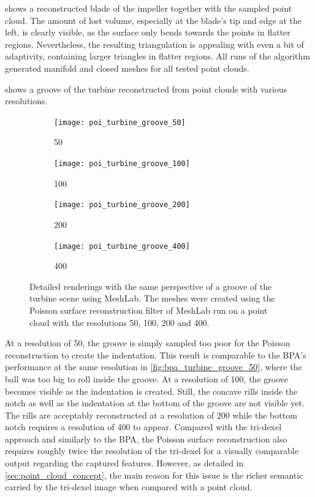  shows a reconstructed blade of the impeller together with the sampled point cloud.
The amount of lost volume, especially at the blade's tip and edge at the left, is clearly visible, as the surface only bends towards the points in flatter regions.
Nevertheless, the resulting triangulation is appealing with even a bit of adaptivity, containing larger triangles in flatter regions.
All runs of the algorithm generated manifold and closed meshes for all tested point clouds.

 shows a groove of the turbine reconstructed from point clouds with various resolutions.
%
\begin{figure}
	\begin{subfigure}[b]{0.24\textwidth}
		\centering
		\texttt{[image: poi\_turbine\_groove\_50]}
		\caption{50}
		\label{fig:poi_turbine_groove_50}
	\end{subfigure}
	\begin{subfigure}[b]{0.24\textwidth}
		\centering
		\texttt{[image: poi\_turbine\_groove\_100]}
		\caption{100}
		\label{fig:poi_turbine_groove_100}
	\end{subfigure}
	\begin{subfigure}[b]{0.24\textwidth}
		\centering
		\texttt{[image: poi\_turbine\_groove\_200]}
		\caption{200}
		\label{fig:poi_turbine_groove_200}
	\end{subfigure}
	\begin{subfigure}[b]{0.24\textwidth}
		\centering
		\texttt{[image: poi\_turbine\_groove\_400]}
		\caption{400}
		\label{fig:poi_turbine_groove_400}
	\end{subfigure}
	\caption{
		Detailed renderings with the same perspective of a groove of the turbine scene using MeshLab.
		The meshes were created using the Poisson surface reconstruction filter of MeshLab run on a point cloud with the resolutions 50, 100, 200 and 400.
	}
	\label{fig:poi_grooves}
\end{figure}
%
At a resolution of 50, the groove is simply sampled too poor for the Poisson reconstruction to create the indentation.
This result is comparable to the BPA's performance at the same resolution in \cref{fig:bpa_turbine_groove_50}, where the ball was too big to roll inside the groove.
At a resolution of 100, the groove becomes visible as the indentation is created.
Still, the concave rills inside the notch as well as the indentation at the bottom of the groove are not visible yet.
The rills are acceptably reconstructed at a resolution of 200 while the bottom notch requires a resolution of 400 to appear.
Compared with the tri-dexel approach and similarly to the BPA, the Poisson surface reconstruction also requires roughly twice the resolution of the tri-dexel for a visually comparable output regarding the captured features.
However, as detailed in \cref{sec:point_cloud_concept}, the main reason for this issue is the richer semantic carried by the tri-dexel image when compared with a point cloud.


